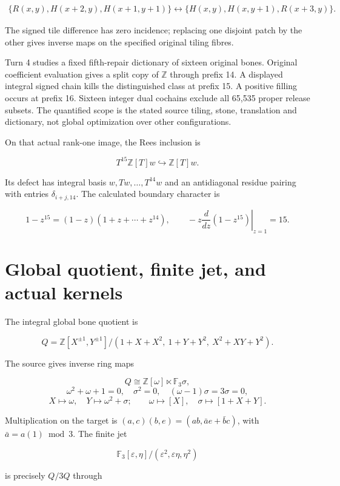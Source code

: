 \documentclass[
  10pt,
]{scrreprt}
\begin{document}
\[\begin{aligned}
\{R(x,y),H(x+2,y),H(x+1,y+1)\}
\longleftrightarrow
\{H(x,y),H(x,y+1),R(x+3,y)\}.
\end{aligned}\]

The signed tile difference has zero incidence; replacing one disjoint
patch by the other gives inverse maps on the specified original tiling
fibres.

Turn 4 studies a fixed fifth-repair dictionary of sixteen original
bones. Original coefficient evaluation gives a split copy of
\(\mathbb Z\) through prefix 14. A displayed integral signed chain kills
the distinguished class at prefix 15. A positive filling occurs at
prefix 16. Sixteen integer dual cochains exclude all 65,535 proper
release subsets. The quantified scope is the stated source tiling,
stone, translation and dictionary, not global optimization over other
configurations.

On that actual rank-one image, the Rees inclusion is

\[T^{15}\mathbb Z[T]w\hookrightarrow\mathbb Z[T]w.\]

Its defect has integral basis \(w,Tw,\ldots,T^{14}w\) and an
antidiagonal residue pairing with entries \(\delta_{i+j,14}\). The
calculated boundary character is

\[1-z^{15}=(1-z)(1+z+\cdots+z^{14}),\qquad
-\left.z\frac{d}{dz}(1-z^{15})\right|_{z=1}=15.\]

\section{Global quotient, finite jet, and actual
kernels}\label{global-quotient-finite-jet-and-actual-kernels}

The integral global bone quotient is

\[Q=\mathbb Z[X^{\pm1},Y^{\pm1}]/(1+X+X^2,\ 1+Y+Y^2,\ X^2+XY+Y^2).\]

The source gives inverse ring maps

\[Q\cong\mathbb Z[\omega]\ltimes\mathbb F_3\sigma,\]
\[\omega^2+\omega+1=0,\quad \sigma^2=0,\quad(\omega-1)\sigma=3\sigma=0,\]
\[X\mapsto\omega,\quad Y\mapsto\omega^2+\sigma;
\qquad\omega\mapsto[X],\quad\sigma\mapsto[1+X+Y].\]

Multiplication on the target is \((a,c)(b,e)=(ab,\bar a e+\bar b c)\),
with \(\bar a=a(1)\bmod3\). The finite jet

\[\mathbb F_3[\varepsilon,\eta]/(\varepsilon^2,\varepsilon\eta,\eta^2)\]

is precisely \(Q/3Q\) through
\end{document}
